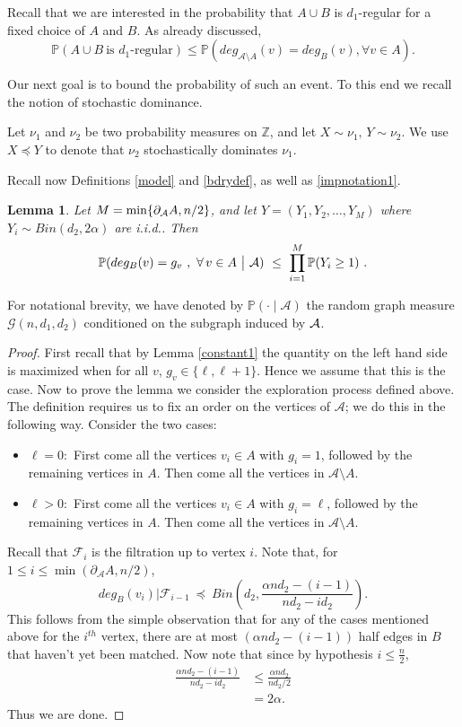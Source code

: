 \documentclass[11pt,reqno]{amsart}
\newtheorem{lemma}{Lemma}
\begin{document}
Recall that we are interested in the probability that $A\cup B$ is
$d_1$-regular for a fixed choice of $A$ and $B$. As already discussed, 
\begin{equation}\label{checkpoint}
\mathbb{P}(A\cup B~ \mbox{is $d_1$-regular})\leq \mathbb{P}(deg_{\mathcal{A}\setminus A}(v)=deg_B(v),\forall v\in A).
\end{equation}

Our next goal is to bound the probability of such an event. To this
end we recall the notion of stochastic dominance. 

Let  $\nu_1$ and $\nu_2$ be two probability measures on $\mathbb{Z}$,
and let $X \sim \nu_1,\,Y \sim \nu_2.$ We use $X \preceq Y$ to denote that $\nu_2$ stochastically dominates $\nu_1$. 

Recall now Definitions \ref{model} and \ref{bdrydef}, as well as
\eqref{impnotation1}.
\begin{lemma}\label{domination} Let $M=\min \{\partial_{\mathcal{A}} A,n/2\}$,
and let $Y=(Y_1,Y_2,\ldots, Y_{M})$ where $Y_i\sim Bin(d_2,2\alpha)$
are i.i.d.. Then
\[
\mathbb{P}(deg_B(v)=g_v~,~\forall\, v\in A~ \big |~\mathcal{A}) ~\le~ \prod_{i=1}^{M}\mathbb{P}(Y_i\ge 1)~.
\]
\end{lemma}  

For notational brevity, we have denoted by $\mathbb{P}(\cdot\mid \mathcal{A})$ the random graph measure $\mathcal{G}(n,d_1,d_2)$ conditioned on the subgraph induced by $\mathcal{A}$.
\begin{proof}
First recall that by Lemma \ref{constant1} the quantity on the left
hand side is maximized when for all $v$,  $g_v\in \{\ell,\ell+1\}.$ Hence we assume that this is the case.
Now to prove the lemma we consider the exploration process defined
above. The definition requires us to fix an order on the vertices of
$\mathcal{A}$; we do this in the  following way. Consider the  two cases: 
\begin{itemize}
\item [$i$.]$\ell=0:$
First come all the vertices $v_i \in A$ with $g_i=1$, followed by the remaining vertices in $A$. Then come all the vertices in $\mathcal{A}\setminus A$.
\item [$ii$.] $\ell>0:$
First come all the vertices $v_i \in A$ with $g_i=\ell$, followed by the remaining vertices in $A$. Then come all the vertices in $\mathcal{A}\setminus A$. 
\end{itemize}
Recall that $\mathcal{F}_i$ is the filtration up to vertex $i.$
Note that, for $1\leq i \leq \min (\partial_{\mathcal{A}} A,n/2)$, 
\[
deg_B(v_i) \big |\mathcal{F}_{i-1}~\preceq~Bin\left(d_2,\frac{\alpha nd_2-(i-1)}{nd_2-id_2}\right).
\]
This follows from the simple observation that for any of the cases
mentioned above for the $i^{th}$ vertex, there are at most $(\alpha
nd_2-(i-1))$ half edges in $B$ that haven't yet been matched. 
Now note that since by hypothesis $i\le \frac{n}{2},$
\begin{align*}
\frac{\alpha nd_2-(i-1)}{nd_2-id_2}& \le \frac{\alpha n d_2}{nd_2/2}\\
&= 2\alpha. 
\end{align*}
Thus we are done.
\end{proof}
\end{document}
